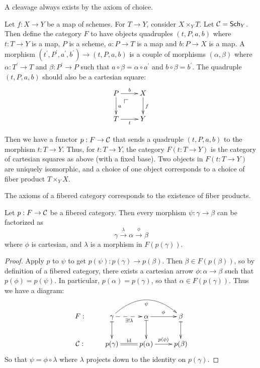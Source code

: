 \documentclass[11pt, english]{article}
\begin{document}
A cleavage always exists by the axiom of choice.

\begin{example}
Let $f:X \to Y$ be a map of schemes. For $T \to Y$, consider $X \times_Y T$. Let $\mathcal{C} = \mathsf{Sch}_{Y}$. Then define the category $F$ to have objects quadruples $(t,P,a,b)$ where $t:T \to Y$ is a map, $P$ is a scheme, $a:P \to T$ is a map and $b:P \to X$ is a map. A morphism $(t^\prime, P^\prime, a^\prime, b^\prime) \to (t,P,a,b)$ is a couple of morphisms $(\alpha,\beta)$ where $\alpha:T^\prime \to T$ and $\beta:P^\prime \to P$ such that $a \circ \beta = \alpha \circ a^\prime$ and $b \circ \beta = b^\prime$. The quadruple $(t,P,a,b)$ should also be a cartesian square:
\[
\xymatrix{
P \ar[r]^b \pullbackcorner  \ar[d]^a & X \ar[d]^f \\
T \ar[r]_t & Y 
}
\] 

Then we have a functor $p:F \to \mathcal{C}$ that sends a quadruple $(t,P,a,b)$ to the morphism $t:T \to Y$. Thus, for $t:T \to Y$, the category $F(t:T \to Y)$ is the category of cartesian squares as above (with a fixed base). Two objects in $F(t:T \to Y)$ are uniquely isomorphic, and a choice of one object corresponds to a choice of fiber product $T \times_Y X$. 

The axioms of a fibered category corresponds to the existence of fiber products.
\end{example}

\begin{lemma}
\label{lemma:factorcartesian}
Let $p:F \to \mathcal{C}$ be a fibered category. Then every morphism $\psi:\gamma \to \beta$ can be factorized as 
\[
\gamma \xrightarrow{\lambda} \alpha \xrightarrow{\phi} \beta
\]
where $\phi$ is cartesian, and $\lambda$ is a morphism in $F(p(\gamma))$.
\end{lemma}
\begin{proof}
Apply $p$ to $\psi$ to get $p(\psi):p(\gamma) \to p(\beta)$. Then $\beta \in F(p(\beta))$, so by definition of a fibered category, there exists a cartesian arrow $\phi:\alpha \to \beta$ such that $p(\phi)=p(\psi)$. In particular, $p(\alpha)=p(\gamma)$, so that $\alpha \in F(p(\gamma))$. Thus we have a diagram:
\[
\xymatrix{
F: & \gamma \ar@/^2pc/[rr]_\psi \ar@{-->}[r]_{\exists ! \lambda} \ar@{|->}[d] & \alpha \ar@{|->}[d] \ar[r]^\phi & \beta \ar@{|->}[d] \\
\CC: & p(\gamma) \ar@{=}[r] ^{\id} & p(\alpha) \ar[r]^{p(\phi)} & p(\beta)
}
\]
So that $\psi=\phi \circ \lambda$ where $\lambda$ projects down to the identity on $p(\gamma)$. 
\end{proof}
\end{document}
